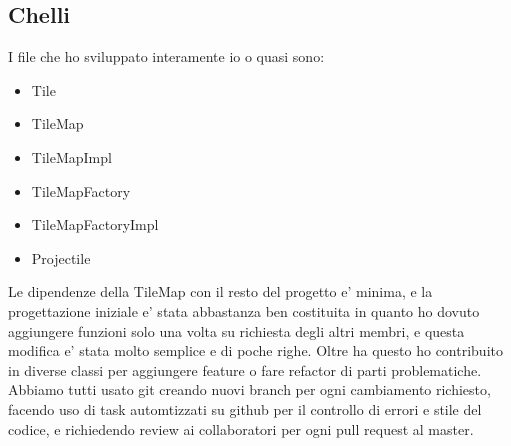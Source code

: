 \documentclass[a4paper,12pt]{report}
\begin{document}
    \subsection{Chelli}
    I file che ho sviluppato interamente io o quasi sono:
    \begin{itemize}
        \item Tile
        \item TileMap
        \item TileMapImpl
        \item TileMapFactory
        \item TileMapFactoryImpl
        \item Projectile
    \end{itemize}
    Le dipendenze della TileMap con il resto del progetto e' minima, e la progettazione iniziale e' stata abbastanza ben costituita
    in quanto ho dovuto aggiungere funzioni solo una volta su richiesta degli altri membri,
    e questa modifica e' stata molto semplice e di poche righe.
    Oltre ha questo ho contribuito in diverse classi per aggiungere feature o fare refactor di parti problematiche.
    Abbiamo tutti usato git creando nuovi branch per ogni cambiamento richiesto,
    facendo uso di task automtizzati su github per il controllo di errori e stile del codice,
    e richiedendo review ai collaboratori per ogni pull request al master.
\end{document}
